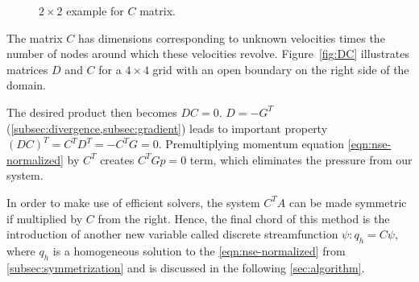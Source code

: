 \documentclass{article}
\begin{document}
\begin{figure}[h] %
  \caption{$2\times 2$ example for $C$ matrix.}\label{fig:C-example-2x2}
\end{figure}


The matrix $C$ has dimensions corresponding to unknown velocities times the number of nodes around which these velocities revolve. Figure~\ref{fig:DC} illustrates matrices $D$ and $C$ for a $4\times4$ grid with an open boundary on the right side of the domain. 

The desired product then becomes $DC=0$. $D=-G^T$ (\cref{subsec:divergence,subsec:gradient}) leads to important property $(DC)^T=C^TD^T=-C^TG=0$. Premultiplying momentum equation \cref{eqn:nse-normalized} by $C^T$ creates $C^TGp=0$ term, which eliminates the pressure from our system.

In order to make use of efficient solvers, the system $C^TA$ can be made symmetric if multiplied by $C$ from the right. Hence, the final chord of this method is the introduction of another new variable called discrete streamfunction $\psi:q_h=C\psi$, where $q_h$ is a homogeneous solution to the \cref{eqn:nse-normalized} from \cref{subsec:symmetrization} and is discussed in the following \cref{sec:algorithm}.
\end{document}
